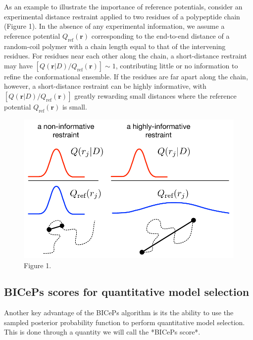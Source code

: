 As an example to illustrate the importance of reference potentials,
consider an experimental distance restraint applied to two residues of a
polypeptide chain (Figure 1). In the absence of any experimental
information, we assume a reference potential
\(Q_{\text{ref}}(\mathbf{r})\) corresponding to the end-to-end distance
of a random-coil polymer with a chain length equal to that of the
intervening residues. For residues near each other along the chain, a
short-distance restraint may have
\([Q(\mathbf{r}|D)/Q_{\text{ref}}(\mathbf{r})] \sim 1\), contributing
little or no information to refine the conformational ensemble. If the
residues are far apart along the chain, however, a short-distance
restraint can be highly informative, with
\([Q(\mathbf{r}|D)/Q_{\text{ref}}(\mathbf{r})]\) greatly rewarding small
distances where the reference potential \(Q_{\text{ref}}(\mathbf{r})\)
is small.

\begin{figure}
\centering
\includegraphics{figures/Figure1.pdf}
\caption{Figure 1.}
\end{figure}

\hypertarget{biceps-scores-for-quantitative-model-selection}{%
\subsection{BICePs scores for quantitative model
selection}\label{biceps-scores-for-quantitative-model-selection}}

Another key advantage of the BICePs algorithm is its the ability to use
the sampled posterior probability function to perform quantitative model
selection. This is done through a quantity we will call the *BICePs
score*.

